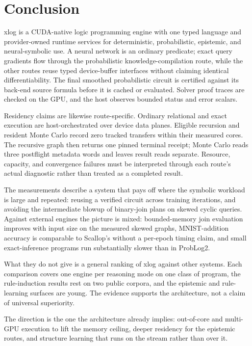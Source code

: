 \section{Conclusion}\label{sec:conclusion}

xlog is a CUDA-native logic programming engine with one typed language and
provider-owned runtime services for deterministic, probabilistic, epistemic,
and neural-symbolic use. A neural network is an ordinary predicate; exact query
gradients flow through the probabilistic knowledge-compilation route, while the
other routes reuse typed device-buffer interfaces without claiming identical
differentiability. The final smoothed probabilistic circuit is certified against
its back-end source formula before it is cached or evaluated. Solver proof traces
are checked on the GPU, and the host observes bounded status and error scalars.

Residency claims are likewise route-specific. Ordinary relational and exact
execution are host-orchestrated over device data planes. Eligible recursion and
resident Monte Carlo record zero tracked transfers within their measured cores.
The recursive graph then returns one pinned terminal receipt; Monte Carlo reads
three postflight metadata words and leaves result reads separate. Resource,
capacity, and convergence failures must be interpreted through each route's
actual diagnostic rather than treated as a completed result.

The measurements describe a system that pays off where the symbolic workload
is large and repeated: reusing a verified circuit across training iterations,
and avoiding the intermediate blowup of binary-join plans on skewed cyclic
queries. Against external engines the picture is mixed: bounded-memory join
evaluation improves with input size on the measured skewed graphs, MNIST-addition
accuracy is comparable to Scallop's without a per-epoch timing claim, and small
exact-inference programs run substantially slower than in ProbLog2.

What they do not give is a general ranking of xlog against other systems. Each
comparison covers one engine per reasoning mode on one class of program, the
rule-induction results rest on two public corpora, and the epistemic and
rule-learning surfaces are young. The evidence supports the architecture, not
a claim of universal superiority.

The direction is the one the architecture already implies: out-of-core and
multi-GPU execution to lift the memory ceiling, deeper residency for the
epistemic routes, and structure learning that runs on the stream rather than
over it.
